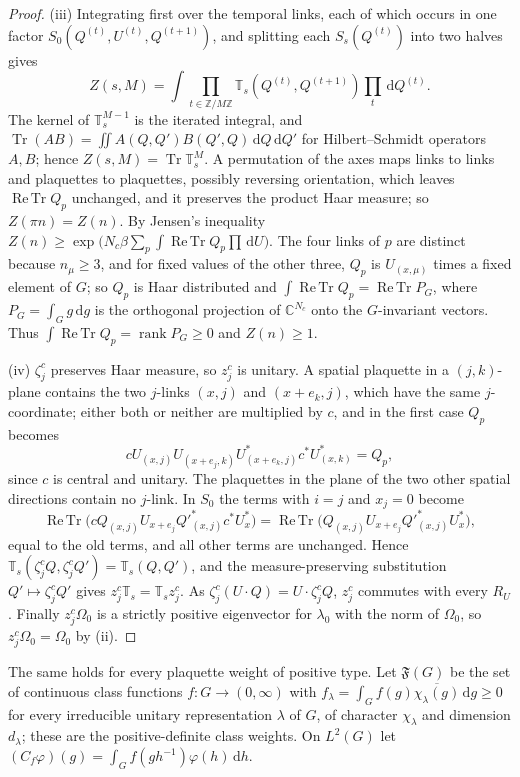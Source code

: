 \documentclass[11pt,a4paper]{amsart}
\theoremstyle{definition}
\theoremstyle{remark}
\numberwithin{equation}{section}
\DeclareMathOperator{\Tr}{Tr}        %
\DeclareMathOperator{\ReTr}{Re\,Tr}  %
\DeclareMathOperator{\rank}{rank}    %
\newcommand{\C}{\mathbb{C}}          %
\newcommand{\Z}{\mathbb{Z}}          %
\newcommand{\Fclass}{\mathfrak{F}}   %
\newcommand{\dd}{\,\mathrm{d}}             %
\newcommand{\TT}{\mathbb{T}}               %
\newcommand{\Zpart}[2]{Z(#1,#2)}           %
\newcommand{\lzero}{\lambda_0}             %
\newcommand{\Omegazero}{\Omega_0}          %
\begin{document}
\begin{proof}
(iii) Integrating first over the temporal links, each of which occurs in one factor $S_0(Q^{(t)},U^{(t)},Q^{(t+1)})$, and splitting each $S_s(Q^{(t)})$ into two halves gives
\[
\Zpart{s}{M}=\int\prod_{t\in\Z/M\Z}\TT_s(Q^{(t)},Q^{(t+1)})\prod_t\dd Q^{(t)} .
\]
The kernel of $\TT_s^{M-1}$ is the iterated integral, and $\Tr(AB)=\iint A(Q,Q')B(Q',Q)\dd Q\dd Q'$ for Hilbert--Schmidt operators $A,B$; hence $\Zpart{s}{M}=\Tr\TT_s^M$. A permutation of the axes maps links to links and plaquettes to plaquettes, possibly reversing orientation, which leaves $\ReTr Q_p$ unchanged, and it preserves the product Haar measure; so $Z(\pi n)=Z(n)$. By Jensen's inequality $Z(n)\ge\exp\bigl(N_c\beta\sum_p\int\ReTr Q_p\prod\dd U\bigr)$. The four links of $p$ are distinct because $n_\mu\ge3$, and for fixed values of the other three, $Q_p$ is $U_{(x,\mu)}$ times a fixed element of $G$; so $Q_p$ is Haar distributed and $\int\ReTr Q_p=\ReTr P_G$, where $P_G=\int_Gg\dd g$ is the orthogonal projection of $\C^{N_c}$ onto the $G$-invariant vectors. Thus $\int\ReTr Q_p=\rank P_G\ge0$ and $Z(n)\ge1$.

(iv) $\zeta_j^c$ preserves Haar measure, so $z_j^c$ is unitary. A spatial plaquette in a $(j,k)$-plane contains the two $j$-links $(x,j)$ and $(x+e_k,j)$, which have the same $j$-coordinate; either both or neither are multiplied by $c$, and in the first case $Q_p$ becomes
\[
cU_{(x,j)}U_{(x+e_j,k)}U^*_{(x+e_k,j)}c^*U^*_{(x,k)}=Q_p,
\]
since $c$ is central and unitary. The plaquettes in the plane of the two other spatial directions contain no $j$-link. In $S_0$ the terms with $i=j$ and $x_j=0$ become
\[
\ReTr\bigl(cQ_{(x,j)}U_{x+e_j}Q'^*_{(x,j)}c^*U_x^*\bigr)=\ReTr\bigl(Q_{(x,j)}U_{x+e_j}Q'^*_{(x,j)}U_x^*\bigr),
\]
equal to the old terms, and all other terms are unchanged. Hence $\TT_s(\zeta_j^cQ,\zeta_j^cQ')=\TT_s(Q,Q')$, and the measure-preserving substitution $Q'\mapsto\zeta_j^cQ'$ gives $z_j^c\TT_s=\TT_sz_j^c$. As $\zeta_j^c(U\cdot Q)=U\cdot\zeta_j^cQ$, $z_j^c$ commutes with every $R_U$. Finally $z_j^c\Omegazero$ is a strictly positive eigenvector for $\lzero$ with the norm of $\Omegazero$, so $z_j^c\Omegazero=\Omegazero$ by (ii).
\end{proof}

The same holds for every plaquette weight of positive type. Let $\Fclass(G)$ be the set of continuous class functions $f\colon G\to(0,\infty)$ with $f_\lambda=\int_Gf(g)\overline{\chi_\lambda(g)}\dd g\ge0$ for every irreducible unitary representation $\lambda$ of $G$, of character $\chi_\lambda$ and dimension $d_\lambda$; these are the positive-definite class weights. On $L^2(G)$ let $(C_f\varphi)(g)=\int_Gf(gh^{-1})\varphi(h)\dd h$.
\end{document}
